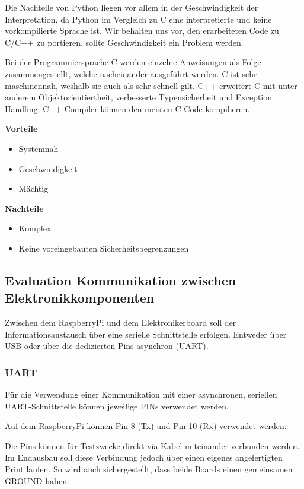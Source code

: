\documentclass[a4paper]{report}
\begin{document}
Die Nachteile von Python liegen vor allem in der Geschwindigkeit der Interpretation, da Python im Vergleich zu C eine interpretierte und keine vorkompilierte Sprache ist. Wir behalten uns vor, den erarbeiteten Code zu C/C++ zu portieren, sollte Geschwindigkeit ein Problem werden.

Bei der Programmiersprache C werden einzelne Anweisungen als Folge zusammengestellt, welche nacheinander ausgeführt werden. C ist sehr maschinennah, weshalb sie auch als sehr schnell gilt. C++ erweitert C mit unter anderem Objektorientiertheit, verbesserte Typensicherheit und Exception Handling. C++ Compiler können den meisten C Code kompilieren. \parencite{Mishra2015}

\begin{multicols}{2}
	\textbf{Vorteile}
	\begin{itemize}[label={+},noitemsep]
		\item Systemnah
		\item Geschwindigkeit
		\item Mächtig
	\end{itemize}
	\columnbreak
	\textbf{Nachteile}
	\begin{itemize}[label={-},noitemsep]
		\item Komplex
		\item Keine voreingebauten Sicherheitsbegrenzungen
	\end{itemize}
\end{multicols}

\subsection{Evaluation Kommunikation zwischen Elektronikkomponenten}
\label{app:ssec:EvalKomm}
Zwischen dem RaspberryPi und dem Elektronikerboard soll der Informationsaustausch über eine serielle Schnittstelle erfolgen. Entweder über USB oder über die dedizierten Pins asynchron (UART).

\subsubsection{UART}
\label{app:ssec:EvalUART}
Für die Verwendung einer Kommunikation mit einer asynchronen, seriellen UART-Schnittstelle können jeweilige PINs verwendet werden.

Auf dem RaspberryPi können Pin 8 (Tx) und Pin 10 (Rx) verwendet werden.

Die Pins können für Testzwecke direkt via Kabel miteinander verbunden werden. Im Endausbau soll diese Verbindung jedoch über einen eigenes angefertigten Print laufen. So wird auch sichergestellt, dass beide Boards einen gemeinsamen GROUND haben.
\end{document}
